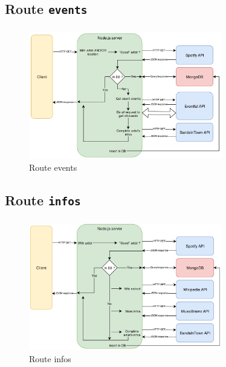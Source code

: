 \documentclass[10pt]{beamer}
\begin{document}
\subsection{Route \texttt{events}}
\begin{frame}
	\frametitle{\secname}
	\framesubtitle{\subsecname}
	\begin{figure}
		\begin{center}
			\includegraphics[width=0.75\textwidth]{images/events.png}
		\end{center}
		\caption{Route events}
	\end{figure}
\end{frame}

\subsection{Route \texttt{infos}}
\begin{frame}
	\frametitle{\secname}
	\framesubtitle{\subsecname}
	\begin{figure}
		\begin{center}
			\includegraphics[width=0.75\textwidth]{images/infos.png}
		\end{center}
		\caption{Route infos}
	\end{figure}
\end{frame}
\end{document}

